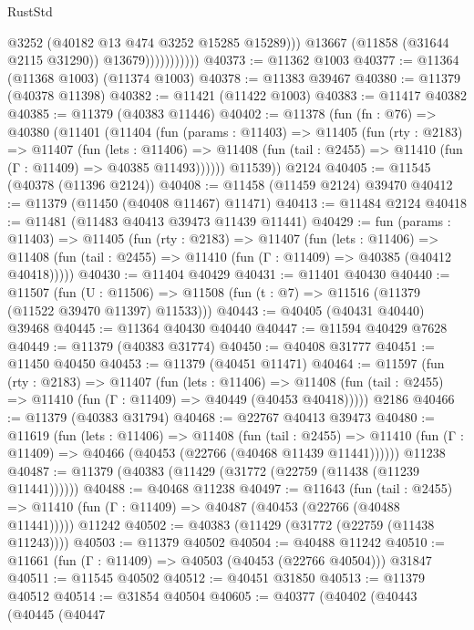 \begin{lexlean}{RustStd}
\begin{coremodule}
                              @3252
                              (@40182 @13 @474 @3252 @15285 @15289)))
                          @13667
                          (@11858 (@31644 @2115 @31290))
                          @13679)))))))))))
@40373 := @11362 @1003
@40377 := @11364 (@11368 @1003) (@11374 @1003)
@40378 := @11383 @39467
@40380 := @11379 (@40378 @11398)
@40382 := @11421 (@11422 @1003)
@40383 := @11417 @40382
@40385 := @11379 (@40383 @11446)
@40402 := @11378
    (fun (fn : @76) =>
    @40380
      (@11401
        (@11404
          (fun (params : @11403) =>
          @11405
            (fun (rty : @2183) =>
            @11407
              (fun (lets : @11406) =>
              @11408 (fun (tail : @2455) => @11410 (fun (Γ : @11409) => @40385 @11493))))))
        @11539))
    @2124
@40405 := @11545 (@40378 (@11396 @2124))
@40408 := @11458 (@11459 @2124) @39470
@40412 := @11379 (@11450 (@40408 @11467) @11471)
@40413 := @11484 @2124
@40418 := @11481 (@11483 @40413 @39473 @11439 @11441)
@40429 := fun (params : @11403) =>
  @11405
    (fun (rty : @2183) =>
    @11407
      (fun (lets : @11406) =>
      @11408 (fun (tail : @2455) => @11410 (fun (Γ : @11409) => @40385 (@40412 @40418)))))
@40430 := @11404 @40429
@40431 := @11401 @40430
@40440 := @11507
    (fun (U : @11506) => @11508 (fun (t : @7) => @11516 (@11379 (@11522 @39470 @11397) @11533)))
@40443 := @40405 (@40431 @40440) @39468
@40445 := @11364 @40430 @40440
@40447 := @11594 @40429 @7628
@40449 := @11379 (@40383 @31774)
@40450 := @40408 @31777
@40451 := @11450 @40450
@40453 := @11379 (@40451 @11471)
@40464 := @11597
    (fun (rty : @2183) =>
    @11407
      (fun (lets : @11406) =>
      @11408 (fun (tail : @2455) => @11410 (fun (Γ : @11409) => @40449 (@40453 @40418)))))
    @2186
@40466 := @11379 (@40383 @31794)
@40468 := @22767 @40413 @39473
@40480 := @11619
    (fun (lets : @11406) =>
    @11408
      (fun (tail : @2455) =>
      @11410 (fun (Γ : @11409) => @40466 (@40453 (@22766 (@40468 @11439 @11441))))))
    @11238
@40487 := @11379 (@40383 (@11429 (@31772 (@22759 (@11438 (@11239 @11441))))))
@40488 := @40468 @11238
@40497 := @11643
    (fun (tail : @2455) => @11410 (fun (Γ : @11409) => @40487 (@40453 (@22766 (@40488 @11441)))))
    @11242
@40502 := @40383 (@11429 (@31772 (@22759 (@11438 @11243))))
@40503 := @11379 @40502
@40504 := @40488 @11242
@40510 := @11661 (fun (Γ : @11409) => @40503 (@40453 (@22766 @40504))) @31847
@40511 := @11545 @40502
@40512 := @40451 @31850
@40513 := @11379 @40512
@40514 := @31854 @40504
@40605 := @40377
    (@40402
      (@40443
        (@40445
          (@40447

\end{coremodule}
\end{lexlean}

